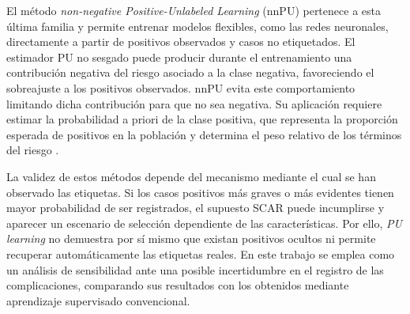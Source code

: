     El método \textit{non-negative Positive-Unlabeled Learning} (nnPU) pertenece a esta última familia y permite entrenar modelos flexibles, como las redes neuronales, directamente a partir de positivos observados y casos no etiquetados. El estimador PU no sesgado puede producir durante el entrenamiento una contribución negativa del riesgo asociado a la clase negativa, favoreciendo el sobreajuste a los positivos observados. nnPU evita este comportamiento limitando dicha contribución para que no sea negativa. Su aplicación requiere estimar la probabilidad a priori de la clase positiva, que representa la proporción esperada de positivos en la población y determina el peso relativo de los términos del riesgo \cite{Kiryo2017}.

    La validez de estos métodos depende del mecanismo mediante el cual se han observado las etiquetas. Si los casos positivos más graves o más evidentes tienen mayor probabilidad de ser registrados, el supuesto SCAR puede incumplirse y aparecer un escenario de selección dependiente de las características. Por ello, \textit{PU learning} no demuestra por sí mismo que existan positivos ocultos ni permite recuperar automáticamente las etiquetas reales. En este trabajo se emplea como un análisis de sensibilidad ante una posible incertidumbre en el registro de las complicaciones, comparando sus resultados con los obtenidos mediante aprendizaje supervisado convencional.





